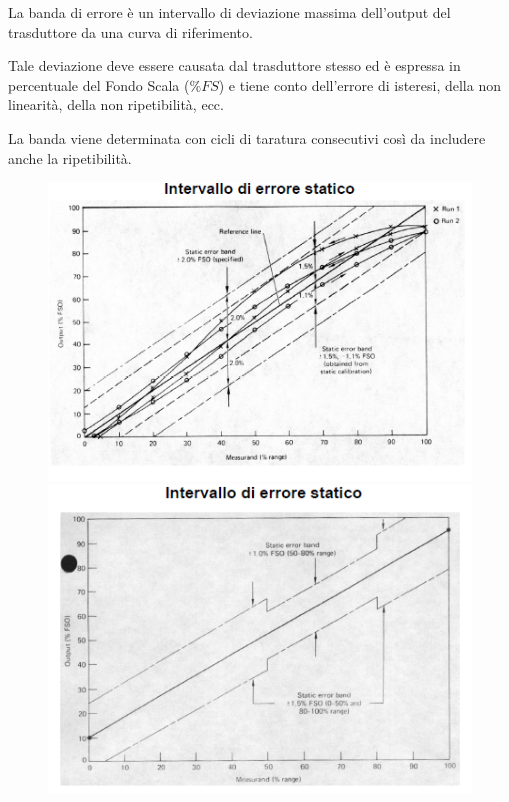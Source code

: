 \documentclass[a4paper, 15pt]{article}
\begin{document}
\begin{adjustwidth}{2in}{}
\begin{enumerate}
 	La banda di errore è un intervallo di deviazione massima dell’output del trasduttore da una curva di
 	riferimento. 
 	
 	Tale deviazione deve essere causata dal trasduttore stesso ed è espressa in percentuale del Fondo Scala ($\%FS$) e tiene conto
 	dell’errore di isteresi, della non linearità, della non ripetibilità, ecc.
 	
 	La banda viene determinata con cicli di taratura consecutivi così da includere
 	anche la ripetibilità.
 	
\begin{figure}[H]
	\centering
	\includegraphics[width=0.5\linewidth]{fig/screenshot026}
	\includegraphics[width=0.5\linewidth]{fig/screenshot027}
	\label{fig:screenshot026}
\end{figure}
\end{enumerate}


\end{adjustwidth}
\newpage
\end{document}
